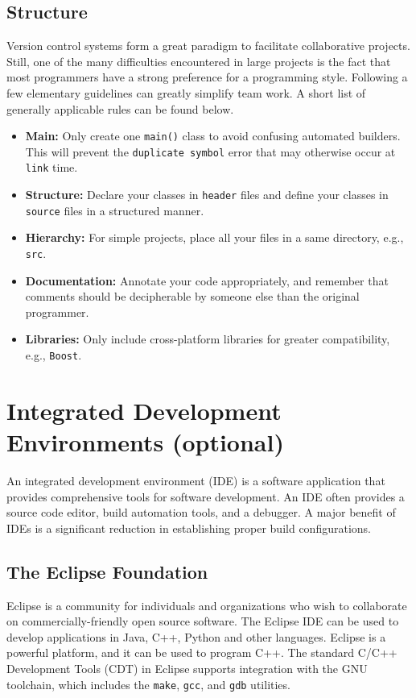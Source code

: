 \documentclass[11pt]{article}
\begin{document}
\subsection*{Structure}

Version control systems form a great paradigm to facilitate collaborative projects.
Still, one of the many difficulties encountered in large projects is the fact that most programmers have a strong preference for a programming style.
Following a few elementary guidelines can greatly simplify team work.
A short list of generally applicable rules can be found below.
\begin{itemize}
\item \textbf{Main:} Only create one \texttt{main()} class to avoid confusing automated builders.
This will prevent the \texttt{duplicate symbol} error that may otherwise occur at \texttt{link} time.
\item \textbf{Structure:} Declare your classes in \texttt{header} files and define your classes in \texttt{source} files in a structured manner.
\item \textbf{Hierarchy:} For simple projects, place all your files in a same directory, e.g., \texttt{src}.
\item \textbf{Documentation:} Annotate your code appropriately, and remember that comments should be decipherable by someone else than the original programmer.
\item \textbf{Libraries:} Only include cross-platform libraries for greater compatibility, e.g., \texttt{Boost}.
\end{itemize}


\newpage
\section{Integrated Development Environments (optional)}

An integrated development environment (IDE) is a software application that provides comprehensive tools for software development.
An IDE often provides a source code editor, build automation tools, and a debugger.
A major benefit of IDEs is a significant reduction in establishing proper build configurations.


\subsection*{The Eclipse Foundation}

Eclipse is a community for individuals and organizations who wish to collaborate on commercially-friendly open source software.
The Eclipse IDE can be used to develop applications in Java, C++, Python and other languages.
Eclipse is a powerful platform, and it can be used to program C++.
The standard C/C++ Development Tools (CDT) in Eclipse supports integration with the GNU toolchain, which includes the \texttt{make}, \texttt{gcc}, and \texttt{gdb} utilities.
\end{document}
